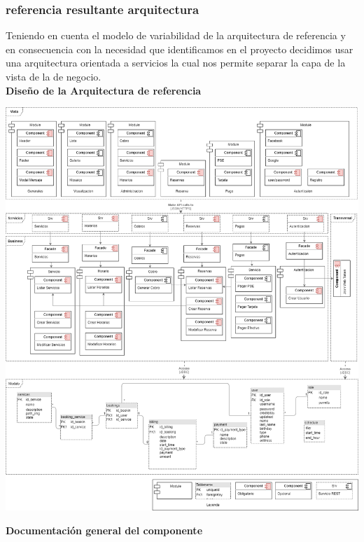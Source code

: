 \documentclass[10pt,a4paper,openany]{book}
\begin{document}
\subsubsection{referencia resultante arquitectura}
Teniendo en cuenta el modelo de variabilidad de la arquitectura de referencia y en consecuencia con la necesidad que identificamos en el proyecto decidimos usar una arquitectura orientada a servicios la cual nos permite separar la capa de la vista de la de negocio.\\
\textbf{Diseño de la Arquitectura de referencia}
\begin{center}
\includegraphics[width=1\textwidth]{arq3}
\end{center}
\vspace{3cm}

\textbf{Documentación general del componente }
\end{document}
